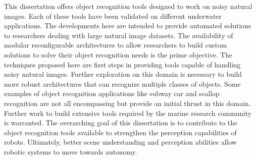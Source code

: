 This dissertation offers object recognition tools designed to work on noisy natural images. Each of these tools have been validated on different underwater applications. The developments here are intended to provide automated solutions to researchers dealing with large natural image datasets.
The availability of modular reconfigurable architectures to allow researchers to build custom solutions to solve their object recognition needs is the prime objective. The techniques proposed here are first steps in providing tools capable of handling noisy natural images. Further exploration on this domain is necessary to build more robust architectures that can recognize multiple classes of objects. Some examples of object recognition applications like subway car and scallop recognition are not all encompassing but provide an initial thrust in this domain. Further work to build extensive tools required by the marine research community is warranted. The overarching goal of this dissertation is to contribute to the object recognition 
tools available to strengthen the perception capabilities of robots. Ultimately, better scene understanding and perception abilities allow robotic systems to move towards autonomy.

